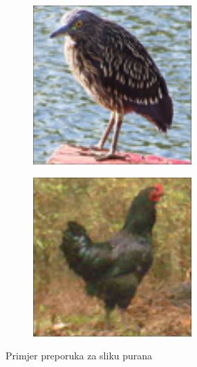 \documentclass[times, utf8, proizvoljni, numeric]{fer}
\begin{document}
\begin{figure}[ht!]
\begin{subfigure}[t]{0.24\textwidth}
	\end{subfigure}
	\begin{subfigure}[t]{0.24\textwidth}
		\includegraphics[width=\textwidth,height=\textwidth]{./imgs/demo-preporucitelja-po-sadrzaju/tijek-rada/id@4710.png}
	\end{subfigure}
	\begin{subfigure}[t]{0.24\textwidth}
		\includegraphics[width=\textwidth,height=\textwidth]{./imgs/demo-preporucitelja-po-sadrzaju/tijek-rada/id@3359.png}
	\end{subfigure}
	\caption{Primjer preporuka za sliku purana}
	\label{fg:demo_bird_v2}
		
\end{figure}
\end{document}

